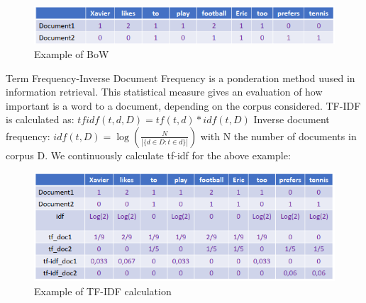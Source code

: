 \documentclass[a4paper,12pt]{report}
\begin{document}
    \begin{figure}[h]
        \includegraphics[scale=1.0]{bow.png}
        \centering
        \caption{Example of BoW}
    \end{figure}

    Term Frequency-Inverse Document Frequency is a ponderation method uused in information retrieval. This statistical measure gives an evaluation of how important is a word to a document, depending on the corpus considered.
    TF-IDF is calculated as: $tfidf(t,d,D) = tf(t,d) * idf(t,D)$
    Inverse document frequency:
    \begin{math}
        idf(t,D) = \log(\frac{N}{|\{d\in D:t\in d\}|})
    \end{math}
    with N the number of documents in corpus D. We continuously calculate tf-idf for the above example:

    \begin{figure}[h]
        \includegraphics[scale=1.0]{tf-idf.png}
        \centering
        \caption{Example of TF-IDF calculation}
    \end{figure}
\end{document}
